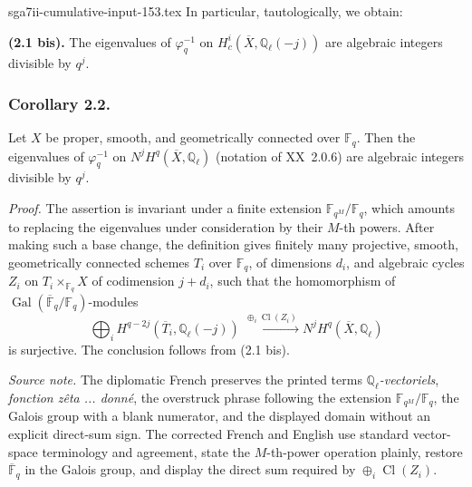 \begin{filecontents*}{sga7ii-cumulative-input-153.tex}
In particular, tautologically, we obtain:

\medskip
\noindent\textbf{(2.1 bis).}
The eigenvalues of $\varphi_q^{-1}$ on
$H_c^i(\overline X,\mathbb Q_\ell(-j))$ are algebraic integers divisible by
$q^j$.

\subsubsection*{Corollary 2.2.}
Let $X$ be proper, smooth, and geometrically connected over $\mathbb F_q$.
Then the eigenvalues of $\varphi_q^{-1}$ on
$N^jH^q(\overline X,\mathbb Q_\ell)$ (notation of XX~2.0.6) are algebraic
integers divisible by $q^j$.

\medskip
\noindent\emph{Proof.}
The assertion is invariant under a finite extension
$\mathbb F_{q^M}/\mathbb F_q$, which amounts to replacing the eigenvalues
under consideration by their $M$-th powers.  After making such a base
change, the definition gives finitely many projective, smooth, geometrically
connected schemes $T_i$ over $\mathbb F_q$, of dimensions $d_i$, and
algebraic cycles $Z_i$ on $T_i\times_{\mathbb F_q}X$ of codimension
$j+d_i$, such that the homomorphism of
$\operatorname{Gal}(\overline{\mathbb F}_q/\mathbb F_q)$-modules
\begin{equation*}
\bigoplus_i H^{q-2j}(\overline T_i,\mathbb Q_\ell(-j))
\xrightarrow{\ \oplus_i\operatorname{Cl}(Z_i)\ }
N^jH^q(\overline X,\mathbb Q_\ell)
\end{equation*}
is surjective.  The conclusion follows from (2.1 bis).

\medskip
\noindent\emph{Source note.}
The diplomatic French preserves the printed terms
\emph{$\mathbb Q_\ell$-vectoriels}, \emph{fonction zêta ... donné}, the
overstruck phrase following the extension $\mathbb F_{q^M}/\mathbb F_q$,
the Galois group with a blank numerator, and the displayed domain without
an explicit direct-sum sign.  The corrected French and English use standard
vector-space terminology and agreement, state the $M$-th-power operation
plainly, restore $\overline{\mathbb F}_q$ in the Galois group, and display
the direct sum required by $\oplus_i\operatorname{Cl}(Z_i)$.
\end{filecontents*}
